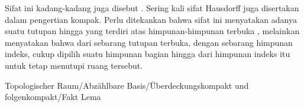 Sifat ini kadang-kadang juga disebut  {.} Sering kali sifat Hausdorff juga disertakan dalam pengertian kompak. Perlu ditekankan bahwa sifat ini
 menyatakan adanya suatu tutupan hingga yang terdiri atas himpunan-himpunan terbuka
 {} {,}
melainkan menyatakan bahwa dari sebarang tutupan terbuka, dengan sebarang himpunan indeks, cukup dipilih suatu himpunan bagian hingga dari himpunan indeks itu untuk tetap menutupi ruang tersebut.



{Topologischer Raum/Abzählbare Basis/Überdeckungskompakt und folgenkompakt/Fakt}
{Lema}
{}
{

\faktzusatz {}
\faktzusatz {}

}
